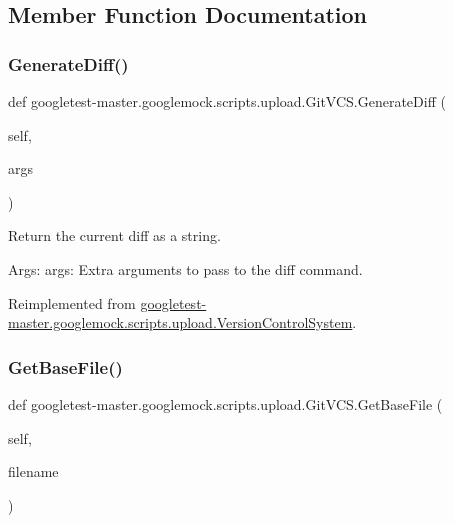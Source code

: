 \subsection{Member Function Documentation}
\mbox{\label{classgoogletest-master_1_1googlemock_1_1scripts_1_1upload_1_1_git_v_c_s_a397feccdaf8a14b5fa39e0911e40c282}} 
\subsubsection{\texorpdfstring{GenerateDiff()}{GenerateDiff()}}
{\footnotesize\ttfamily def googletest-\/master.\+googlemock.\+scripts.\+upload.\+Git\+V\+C\+S.\+Generate\+Diff (\begin{DoxyParamCaption}\item[{}]{self,  }\item[{}]{args }\end{DoxyParamCaption})}

\begin{DoxyVerb}Return the current diff as a string.

Args:
  args: Extra arguments to pass to the diff command.
\end{DoxyVerb}
 

Reimplemented from \mbox{\hyperlink{classgoogletest-master_1_1googlemock_1_1scripts_1_1upload_1_1_version_control_system_ac248927b279c72356690eeacfb0e3841}{googletest-\/master.\+googlemock.\+scripts.\+upload.\+Version\+Control\+System}}.

\mbox{\label{classgoogletest-master_1_1googlemock_1_1scripts_1_1upload_1_1_git_v_c_s_adfdd00d7335071ff4c5096281c3b1c4f}} 
\subsubsection{\texorpdfstring{GetBaseFile()}{GetBaseFile()}}
{\footnotesize\ttfamily def googletest-\/master.\+googlemock.\+scripts.\+upload.\+Git\+V\+C\+S.\+Get\+Base\+File (\begin{DoxyParamCaption}\item[{}]{self,  }\item[{}]{filename }\end{DoxyParamCaption})}

